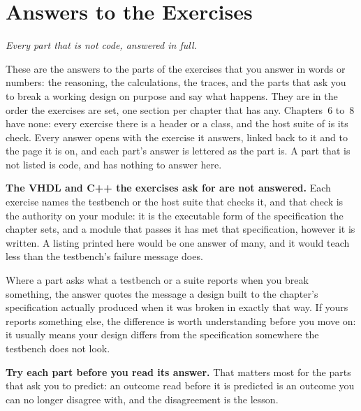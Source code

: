 
\chapter{Answers to the Exercises}
\label{sol:ch}

{\large\itshape Every part that is not code, answered in full.\par}

These are the answers to the parts of the exercises that you answer in words or numbers: the
reasoning, the calculations, the traces, and the parts that ask you to break a working design on
purpose and say what happens. They are in the order the exercises are set, one section per chapter
that has any. Chapters~6 to~8 have none: every exercise there is a header or a class, and the host
suite of  is its check.
Every answer opens with the exercise it answers, linked back to it and to the page it is on, and each part's
answer is lettered as the part is. A part that is not listed is code, and has nothing to answer
here.

\textbf{The VHDL and C++ the exercises ask for are not answered.} Each exercise names the testbench
or the host suite that checks it, and that check is the authority on your module: it is the
executable form of the specification the chapter sets, and a module that passes it has met that
specification, however it is written. A listing printed here would be one answer of many, and it
would teach less than the testbench's failure message does.

Where a part asks what a testbench or a suite reports when you break something, the answer quotes
the message a design built to the chapter's specification actually produced when it was broken in
exactly that way. If yours reports something else, the difference is worth understanding before you
move on: it usually means your design differs from the specification somewhere the testbench does
not look.

\textbf{Try each part before you read its answer.} That matters most for the parts that ask you to
predict: an outcome read before it is predicted is an outcome you can no longer disagree with, and
the disagreement is the lesson.








